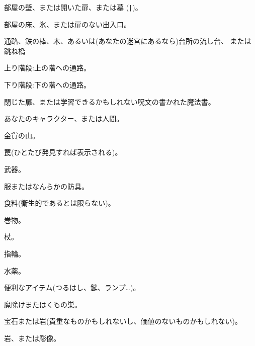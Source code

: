 \blist{}
\item[\tb{"- と |}]
部屋の壁、または開いた扉、または墓 ({\tt |})。
\item[\tb{.}]
部屋の床、氷、または扉のない出入口。
\item[\tb{\#}]
通路、鉄の棒、木、あるいは(あなたの迷宮にあるなら)台所の流し台、
または跳ね橋
\item[\tb{>}]
上り階段:上の階への通路。
\item[\tb{<}]
下り階段:下の階への通路。
\item[\tb{+}]
閉じた扉、または学習できるかもしれない呪文の書かれた魔法書。
\item[\tb{@}]
あなたのキャラクター、または人間。
\item[\tb{\$}]
金貨の山。
\item[\tb{\^}]
罠(ひとたび発見すれば表示される)。
\item[\tb{)}]
武器。
\item[\tb{[}]
服またはなんらかの防具。
\item[\tb{\%}]
食料(衛生的であるとは限らない)。
\item[\tb{?}]
巻物。
\item[\tb{/}]
杖。
\item[\tb{=}]
指輪。
\item[\tb{!}]
水薬。
\item[\tb{(}]
便利なアイテム(つるはし、鍵、ランプ…)。
\item[\tb{"}]
魔除けまたはくもの巣。
\item[\tb{*}]
宝石または岩(貴重なものかもしれないし、価値のないものかもしれない)。
\item[\tb{\`}]
岩、または彫像。
\item[\tb{0}]
